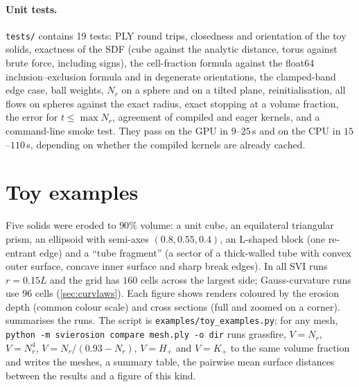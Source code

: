 \documentclass[11pt]{article}
\newcommand{\N}{N_r}
\newcommand{\code}[1]{\texttt{#1}}
\begin{document}
\begin{table}[h]
\centering\small

\caption{Unit cube, $V=\N/(0.93-\N)$, $r=0.15$, $90\%$ volume: symmetric mean and Hausdorff surface
distances to the $256$-cell solution.}\label{tab:cube}
\end{table}

\paragraph{Unit tests.} \code{tests/} contains 19 tests: PLY round trips, closedness and orientation of
the toy solids, exactness of the SDF (cube against the analytic distance, torus against brute force,
including signs), the cell-fraction formula against the float64 inclusion--exclusion formula and in
degenerate orientations, the clamped-band edge case, ball weights, $\N$ on a sphere and on a tilted plane,
reinitialisation, all flows on spheres against the exact radius, exact stopping at a volume fraction, the
error for $t\le\max\N$, agreement of compiled and eager kernels, and a command-line smoke test. They pass
on the GPU in $9$--$25$\,s and on the CPU in $15$--$110$\,s, depending on whether the compiled kernels
are already cached.

\section{Toy examples}\label{sec:toy}

Five solids were eroded to $90\%$ volume: a unit cube, an equilateral triangular prism, an ellipsoid with
semi-axes $(0.8,0.55,0.4)$, an L-shaped block (one re-entrant edge) and a ``tube fragment'' (a sector of a
thick-walled tube with convex outer surface, concave inner surface and sharp break edges). In all SVI runs
$r=0.15L$ and the grid has $160$ cells across the largest side; Gauss-curvature runs use $96$ cells
(\cref{sec:curvlaws}). Each figure shows renders coloured by the erosion depth (common colour scale) and
cross sections (full and zoomed on a corner).  summarises the runs. The script is
\code{examples/toy\_examples.py}; for any mesh, \code{python -m svierosion compare mesh.ply -o dir} runs
grassfire, $V=\N$, $V=\N^4$, $V=\N/(0.93-\N)$, $V=H_+$ and $V=K_+$ to the same volume fraction and
writes the meshes, a summary table, the pairwise mean surface distances between the results and a figure
of this kind.
\end{document}
